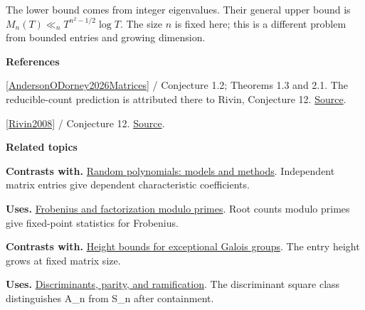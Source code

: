 \documentclass[11pt,a4paper,oneside,openany]{book}
\newcommand{\atlasdisplay}[1]{\par\begingroup\centering\vspace{3pt}\noindent\adjustbox{max width=\linewidth}{\(\displaystyle #1\)}\par\vspace{5pt}\endgroup}
\newenvironment{sources}{\par\smallskip\begingroup\footnotesize\color{atlasgray}\leftskip=10pt\setlength{\parskip}{2pt}}{\par\endgroup\smallskip}
\begin{document}
\atlasdisplay{R_n(T)\sim M_n(T)\asymp_n T^{n^2-n+1}\log T.}
\color{black} The lower bound comes from integer eigenvalues. Their general upper bound is \(M_n(T)\ll_n T^{n^2-1/2}\log T\). The size \(n\) is fixed here; this is a different problem from bounded entries and growing dimension.\par
\begin{sources}
\textbf{References}\par\smallskip
\noindent\hyperlink{ref:AndersonODorney2026Matrices}{[AndersonODorney2026Matrices]} / Conjecture 1.2; Theorems 1.3 and 2.1. The reducible-count prediction is attributed there to Rivin, Conjecture 12. \href{https://www.cambridge.org/core/journals/mathematical-proceedings-of-the-cambridge-philosophical-society/article/galois-groups-of-random-integer-matrices/B87E2B0D71138A94EF7BB1179891456A}{Source}.\par
\noindent\hyperlink{ref:Rivin2008}{[Rivin2008]} / Conjecture 12.  \href{https://arxiv.org/abs/math/0703532}{Source}.\par
\end{sources}\color{black}
\par\medskip\begingroup\footnotesize\setlength{\parskip}{1pt}\textbf{\sffamily\color{atlasgreen}Related topics}\par
\color{black}\textbf{Contrasts with.} \hyperlink{article:random-models}{Random polynomials: models and methods}. Independent matrix entries give dependent characteristic coefficients.\par
\color{black}\textbf{Uses.} \hyperlink{article:frobenius}{Frobenius and factorization modulo primes}. Root counts modulo primes give fixed-point statistics for Frobenius.\par
\color{black}\textbf{Contrasts with.} \hyperlink{article:height-counting}{Height bounds for exceptional Galois groups}. The entry height grows at fixed matrix size.\par
\color{black}\textbf{Uses.} \hyperlink{article:discriminants}{Discriminants, parity, and ramification}. The discriminant square class distinguishes A\_\allowbreak{}n from S\_\allowbreak{}n after containment.\par
\endgroup
\end{document}
